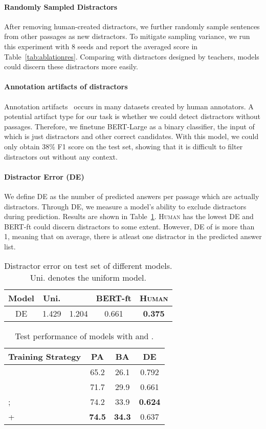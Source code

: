 \documentclass[11pt,a4paper]{article}
\begin{document}
\paragraph{Randomly Sampled Distractors} After removing human-created distractors, we further randomly sample sentences from other passages as new distractors. To mitigate sampling variance, we run this experiment with 8 seeds and report the averaged score in Table~\ref{tab:ablationres}. Comparing with distractors designed by teachers, models could discern these distractors more easily.
\paragraph{Annotation artifacts of distractors} Annotation artifacts~\cite{gururangan2018annotation} occurs in many datasets created by human annotators. A potential artifact type for our task is whether we could detect distractors without passages.  Therefore, we finetune BERT-Large as a binary classifier, the input of which is just distractors and other correct candidates. With this model, we could only obtain 38\% F1 score on the test set, showing that it is difficult to filter distractors out without any context.

\paragraph{Distractor Error (DE)}  We define DE as the number of predicted answers per passage which are actually distractors. Through DE, we measure a model's ability to exclude distractors during prediction. Results are shown in Table~\ref{tab:de_res}. \textsc{Human} has the lowest DE and BERT-ft could discern distractors to some extent. However, DE of   is more than 1, meaning that on average, there is atleast one distractor in the predicted answer list.

\begin{table}
    \centering
    \begin{tabular}{c|cccc}
    \toprule
        Model & Uni. &    & BERT-ft & \textsc{Human} \\
        \midrule
        DE & 1.429 & 1.204 & 0.661 & \textbf{0.375}  \\
        \bottomrule
    \end{tabular}
    \caption{Distractor error on test set of different models. Uni. denotes the uniform model.}
    \label{tab:de_res}
\end{table}

\begin{table}
    \centering
    \begin{tabular}{l|ccc}
    \toprule
        Training Strategy &  PA&BA&DE\\
        \midrule
         &   65.2&26.1&0.792\\
         &  71.7 & 29.9&0.661\\
         ;  & 74.2&33.9&\bf0.624\\
         +  & \bf74.5 & \bf34.3 & 0.637\\
        \bottomrule
    \end{tabular}
    \caption{Test performance of models with  and .}
    \label{tab:random_res}
\end{table}
\end{document}
